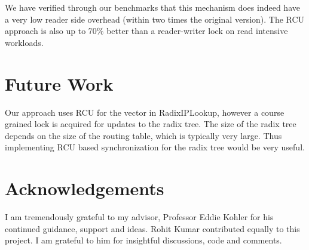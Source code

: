 \documentclass[12pt,a4paper]{article}
\begin{document}
We have verified through our benchmarks that
this mechanism does indeed have a very low reader side overhead
(within two times the original version). The RCU approach is also up to
70\% better than a reader-writer lock on read intensive workloads.

\section{Future Work}


Our approach uses RCU for the vector in RadixIPLookup, however a course grained lock is acquired for updates to the radix tree. The size of the radix tree depends on the size of the routing table, which is typically very large. Thus implementing RCU based synchronization for the radix tree would be very useful.
\section{Acknowledgements}
I am tremendously grateful to my advisor, Professor Eddie Kohler for his continued guidance, support and ideas.
Rohit Kumar contributed equally to this project. I am grateful to him for insightful discussions, code and comments.


\end{document}

